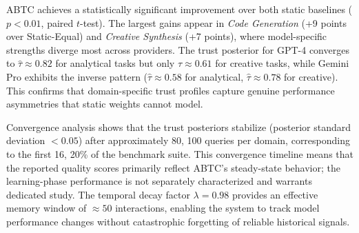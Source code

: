 \documentclass{iopjournal}
\begin{document}
\begin{table}[!ht]
\centering
\caption{ABTC Ablation: Quality Score by Task Domain}
\label{tab:abtc_ablation}
\end{table}

ABTC achieves a statistically significant improvement over both static baselines ($p < 0.01$, paired $t$-test). The largest gains appear in \emph{Code Generation} (+9 points over Static-Equal) and \emph{Creative Synthesis} (+7 points), where model-specific strengths diverge most across providers. The trust posterior for GPT-4 converges to $\hat{\tau} \approx 0.82$ for analytical tasks but only $\hat{\tau} \approx 0.61$ for creative tasks, while Gemini Pro exhibits the inverse pattern ($\hat{\tau} \approx 0.58$ for analytical, $\hat{\tau} \approx 0.78$ for creative). This confirms that domain-specific trust profiles capture genuine performance asymmetries that static weights cannot model.

Convergence analysis shows that the trust posteriors stabilize (posterior standard deviation $< 0.05$) after approximately 80, 100 queries per domain, corresponding to the first 16, 20\% of the benchmark suite. This convergence timeline means that the reported quality scores primarily reflect ABTC's steady-state behavior; the learning-phase performance is not separately characterized and warrants dedicated study. The temporal decay factor $\lambda = 0.98$ provides an effective memory window of $\approx 50$ interactions, enabling the system to track model performance changes without catastrophic forgetting of reliable historical signals.
\end{document}
